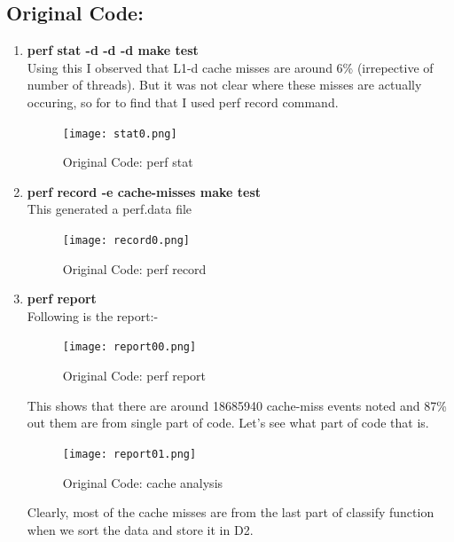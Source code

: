 \documentclass{article}
\begin{document}
\subsection{Original Code: }
\begin{enumerate}
\item \textbf{perf stat -d -d -d make test}\\
Using this I observed that L1-d cache misses are around 6\% (irrepective of number of threads). But it was not clear where these misses are actually occuring, so for to find that I used perf record command.
\begin{figure}[H]
    \centering
    \texttt{[image: stat0.png]}
    \caption{Original Code: perf stat}
\end{figure}

\item \textbf{perf record -e cache-misses make test}\\
This generated a perf.data file
\begin{figure}[H]
    \centering
    \texttt{[image: record0.png]}
    \caption{Original Code: perf record}
\end{figure}

\item \textbf{perf report}\\
Following is the report:- \\
\begin{figure}[H]
    \centering
    \texttt{[image: report00.png]}
    \caption{Original Code: perf report}
\end{figure}


This shows that there are around 18685940 cache-miss events noted and 87\% out them are from single part of code. Let's see what part of code that is.\\

\begin{figure}[H]
    \centering
    \texttt{[image: report01.png]}
    \caption{Original Code: cache analysis}
\end{figure}

Clearly, most of the cache misses are from the last part of classify function when we sort the data and store it in D2. 

\end{enumerate}
\end{document}

